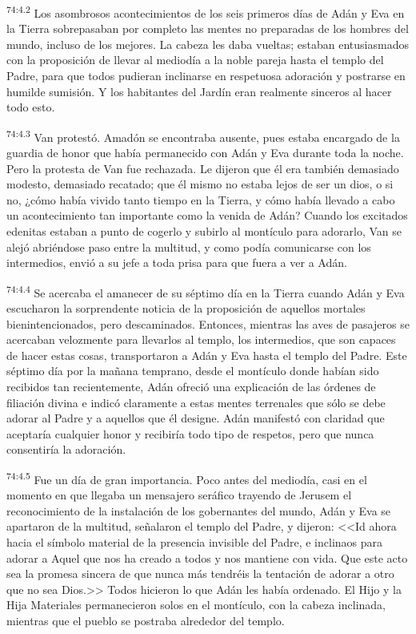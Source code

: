 \par
\textsuperscript{74:4.2} Los asombrosos acontecimientos de los seis primeros días de Adán y Eva en la Tierra sobrepasaban por completo las mentes no preparadas de los hombres del mundo, incluso de los mejores. La cabeza les daba vueltas; estaban entusiasmados con la proposición de llevar al mediodía a la noble pareja hasta el templo del Padre, para que todos pudieran inclinarse en respetuosa adoración y postrarse en humilde sumisión. Y los habitantes del Jardín eran realmente sinceros al hacer todo esto.

\par
\textsuperscript{74:4.3} Van protestó. Amadón se encontraba ausente, pues estaba encargado de la guardia de honor que había permanecido con Adán y Eva durante toda la noche. Pero la protesta de Van fue rechazada. Le dijeron que él era también demasiado modesto, demasiado recatado; que él mismo no estaba lejos de ser un dios, o si no, ¿cómo había vivido tanto tiempo en la Tierra, y cómo había llevado a cabo un acontecimiento tan importante como la venida de Adán? Cuando los excitados edenitas estaban a punto de cogerlo y subirlo al montículo para adorarlo, Van se alejó abriéndose paso entre la multitud, y como podía comunicarse con los intermedios, envió a su jefe a toda prisa para que fuera a ver a Adán.

\par
\textsuperscript{74:4.4} Se acercaba el amanecer de su séptimo día en la Tierra cuando Adán y Eva escucharon la sorprendente noticia de la proposición de aquellos mortales bienintencionados, pero descaminados. Entonces, mientras las aves de pasajeros se acercaban velozmente para llevarlos al templo, los intermedios, que son capaces de hacer estas cosas, transportaron a Adán y Eva hasta el templo del Padre. Este séptimo día por la mañana temprano, desde el montículo donde habían sido recibidos tan recientemente, Adán ofreció una explicación de las órdenes de filiación divina e indicó claramente a estas mentes terrenales que sólo se debe adorar al Padre y a aquellos que él designe. Adán manifestó con claridad que aceptaría cualquier honor y recibiría todo tipo de respetos, pero que nunca consentiría la adoración.

\par
\textsuperscript{74:4.5} Fue un día de gran importancia. Poco antes del mediodía, casi en el momento en que llegaba un mensajero seráfico trayendo de Jerusem el reconocimiento de la instalación de los gobernantes del mundo, Adán y Eva se apartaron de la multitud, señalaron el templo del Padre, y dijeron: <<Id ahora hacia el símbolo material de la presencia invisible del Padre, e inclinaos para adorar a Aquel que nos ha creado a todos y nos mantiene con vida. Que este acto sea la promesa sincera de que nunca más tendréis la tentación de adorar a otro que no sea Dios.>> Todos hicieron lo que Adán les había ordenado. El Hijo y la Hija Materiales permanecieron solos en el montículo, con la cabeza inclinada, mientras que el pueblo se postraba alrededor del templo.

